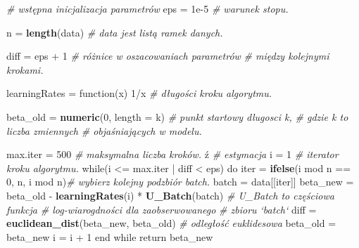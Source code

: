 \documentclass[]{article}
\newenvironment{Shaded}{\begin{snugshade}}{\end{snugshade}}
\newcommand{\KeywordTok}[1]{\textcolor[rgb]{0.13,0.29,0.53}{\textbf{{#1}}}}
\newcommand{\DataTypeTok}[1]{\textcolor[rgb]{0.13,0.29,0.53}{{#1}}}
\newcommand{\DecValTok}[1]{\textcolor[rgb]{0.00,0.00,0.81}{{#1}}}
\newcommand{\FloatTok}[1]{\textcolor[rgb]{0.00,0.00,0.81}{{#1}}}
\newcommand{\StringTok}[1]{\textcolor[rgb]{0.31,0.60,0.02}{{#1}}}
\newcommand{\CommentTok}[1]{\textcolor[rgb]{0.56,0.35,0.01}{\textit{{#1}}}}
\newcommand{\NormalTok}[1]{{#1}}
\begin{document}
\begin{Shaded}
\begin{Highlighting}[]
                    \CommentTok{# wstępna inicjalizacja parametrów}
\NormalTok{eps =}\StringTok{ }\FloatTok{1e-5}                               \CommentTok{# warunek stopu.}

\NormalTok{n =}\StringTok{ }\KeywordTok{length}\NormalTok{(data)                         }\CommentTok{# data jest listą ramek danych.}

\NormalTok{diff =}\StringTok{ }\NormalTok{eps +}\StringTok{ }\DecValTok{1}                           \CommentTok{# różnice w oszacowaniach parametrów}
                                         \CommentTok{# między kolejnymi krokami.}

\NormalTok{learningRates =}\StringTok{ }\NormalTok{function(x) }\DecValTok{1}\NormalTok{/x          }\CommentTok{# długości kroku algorytmu.}

\NormalTok{beta_old =}\StringTok{ }\KeywordTok{numeric}\NormalTok{(}\DecValTok{0}\NormalTok{, }\DataTypeTok{length =} \NormalTok{k)        }\CommentTok{# punkt startowy dlugosci k,}
                                         \CommentTok{# gdzie k to liczba zmiennych}
                                         \CommentTok{# objaśniających w modelu.}

\NormalTok{max.iter =}\StringTok{ }\DecValTok{500}                           \CommentTok{# maksymalna liczba kroków.}
\NormalTok{ź}
                              \CommentTok{# estymacja}
\NormalTok{i =}\StringTok{ }\DecValTok{1}                                    \CommentTok{# iterator kroku algorytmu.}
\NormalTok{while(i <=}\StringTok{ }\NormalTok{max.iter |}\StringTok{ }\NormalTok{diff <}\StringTok{ }\NormalTok{eps) do     }
  \NormalTok{iter =}\StringTok{ }\KeywordTok{ifelse}\NormalTok{(i mod n ==}\StringTok{ }\DecValTok{0}\NormalTok{, n, i mod n)}\CommentTok{# wybierz kolejny podzbiór batch.}
  \NormalTok{batch =}\StringTok{ }\NormalTok{data[[iter]] }
  \NormalTok{beta_new =}\StringTok{ }\NormalTok{beta_old -}\StringTok{ }\KeywordTok{learningRates}\NormalTok{(i) *}\StringTok{ }\KeywordTok{U_Batch}\NormalTok{(batch) }
                                         \CommentTok{# U_Batch to częściowa funkcja}
                                         \CommentTok{# log-wiarogdności dla zaobserwowanego}
                                         \CommentTok{# zbioru `batch`}
  \NormalTok{diff =}\StringTok{ }\KeywordTok{euclidean_dist}\NormalTok{(beta_new, beta_old) }\CommentTok{# odległość euklidesowa}
  \NormalTok{beta_old =}\StringTok{ }\NormalTok{beta_new }
  \NormalTok{i =}\StringTok{ }\NormalTok{i +}\StringTok{ }\DecValTok{1}
\NormalTok{end while}
\NormalTok{return beta_new}
\end{Highlighting}
\end{Shaded}
\end{document}
